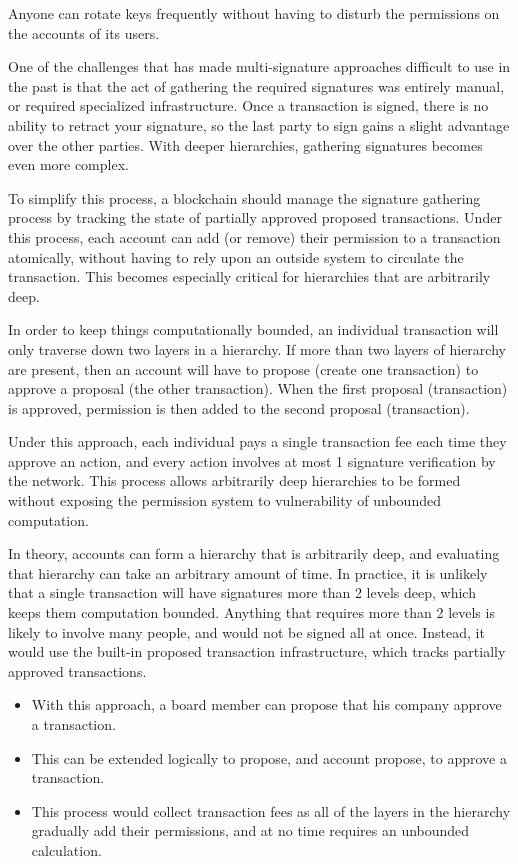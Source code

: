 Anyone can rotate keys frequently without having to disturb the permissions on
the accounts of its users.


One of the challenges that has made multi-signature approaches difficult to use
in the past is that the act of gathering the required signatures was entirely
manual, or required specialized infrastructure. Once a transaction is signed,
there is no ability to retract your signature, so the last party to sign gains
a slight advantage over the other parties. With deeper hierarchies, gathering
signatures becomes even more complex.

To simplify this process, a blockchain should manage the signature gathering
process by tracking the state of partially approved proposed transactions.
Under this process, each account can add (or remove) their permission to a
transaction atomically, without having to rely upon an outside system to
circulate the transaction. This becomes especially critical for hierarchies
that are arbitrarily deep.

In order to keep things computationally bounded, an individual transaction will
only traverse down two layers in a hierarchy. If more than two layers of
hierarchy are present, then an account will have to propose (create one
transaction) to approve a proposal (the other transaction). When the first
proposal (transaction) is approved, permission is then added to the second
proposal (transaction).

Under this approach, each individual pays a single transaction fee each time
they approve an action, and every action involves at most 1 signature
verification by the network. This process allows arbitrarily deep hierarchies
to be formed without exposing the permission system to vulnerability of
unbounded computation.


In theory, accounts can form a hierarchy that is arbitrarily deep, and
evaluating that hierarchy can take an arbitrary amount of time. In practice, it
is unlikely that a single transaction will have signatures more than 2 levels
deep, which keeps them computation bounded. Anything that requires more than 2
levels is likely to involve many people, and would not be signed all at once.
Instead, it would use the built-in proposed transaction infrastructure, which
tracks partially approved transactions.

\begin{itemize}
\item With this approach, a board member can propose that his company approve a
      transaction.
\item This can be extended logically to propose, and account propose, to
      approve a transaction.
\item This process would collect transaction fees as all of the layers in the
      hierarchy gradually add their permissions, and
      at no time requires an unbounded calculation.
\end{itemize}

